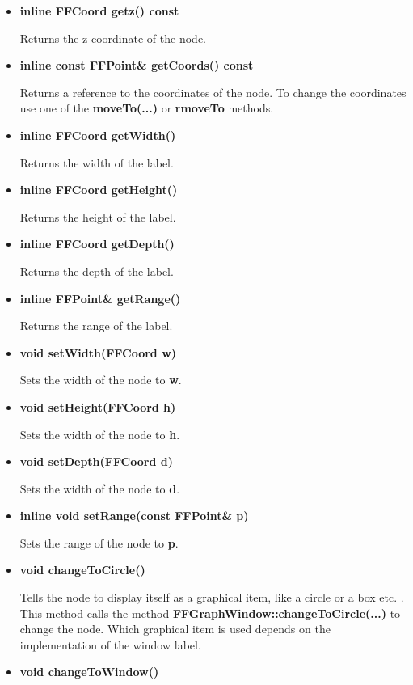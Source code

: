 \begin{itemize}
\item{\bf inline FFCoord getz() const}

  Returns the z coordinate of the node.

\item{\bf inline const FFPoint\& getCoords() const}
  
  Returns a reference to the coordinates of the node. To change
  the coordinates use one of the {\bf moveTo(...)} or {\bf
    rmoveTo} methods.

\item{\bf inline FFCoord getWidth()}

  Returns the width of the label.

\item{\bf inline FFCoord getHeight()}

  Returns the height of the label.

\item{\bf inline FFCoord getDepth()}

  Returns the depth of the label.

\item{\bf inline FFPoint\& getRange()}

  Returns the range of the label.

\item{\bf void setWidth(FFCoord w)}

  Sets the width of the node to {\bf w}.

\item{\bf void setHeight(FFCoord h)}

  Sets the width of the node to {\bf h}.

\item{\bf void setDepth(FFCoord d)}

  Sets the width of the node to {\bf d}.

\item{\bf inline void setRange(const FFPoint\& p)}

  Sets the range of the node to {\bf p}.
 
\item{\bf void changeToCircle()}
  
  Tells the node to display itself as a graphical item, like a
  circle or a box etc. . This method calls the method {\bf
    FFGraphWindow::changeToCircle(...)} to change the node. Which
  graphical item is used depends on the implementation of the
  window label.
        
\item{\bf void changeToWindow()}
  

\end{itemize}
